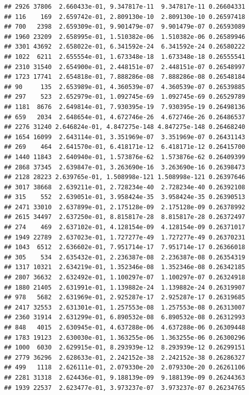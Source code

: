 \documentclass[
]{article}
\begin{document}
\begin{verbatim}
## 2926 37806  2.660433e-01, 9.347817e-11  9.347817e-11 0.26604331
## 116    169  2.659742e-01, 2.809130e-10  2.809130e-10 0.26597418
## 700   2398  2.659309e-01, 9.901479e-07  9.901479e-07 0.26593089
## 1960 23209  2.658995e-01, 1.510382e-06  1.510382e-06 0.26589946
## 3301 43692  2.658022e-01, 6.341592e-24  6.341592e-24 0.26580222
## 1022  6211  2.655554e-01, 1.673348e-18  1.673348e-18 0.26555541
## 2310 31540  2.654900e-01, 2.448151e-07  2.448151e-07 0.26548997
## 1723 17741  2.654818e-01, 7.888286e-08  7.888286e-08 0.26548184
## 90     135  2.653989e-01, 4.360539e-07  4.360539e-07 0.26539885
## 297    523  2.652979e-01, 1.092745e-69  1.092745e-69 0.26529789
## 1181  8676  2.649814e-01, 7.930395e-19  7.930395e-19 0.26498136
## 659   2034  2.648654e-01, 4.672746e-26  4.672746e-26 0.26486537
## 2276 31240 2.646824e-01, 4.847275e-148 4.847275e-148 0.26468240
## 1654 16099  2.643114e-01, 3.351969e-07  3.351969e-07 0.26431143
## 269    464  2.641570e-01, 6.418171e-12  6.418171e-12 0.26415700
## 1440 11843  2.640940e-01, 1.573876e-62  1.573876e-62 0.26409399
## 2868 37345  2.639847e-01, 3.263690e-16  3.263690e-16 0.26398473
## 2128 28223 2.639765e-01, 1.508998e-121 1.508998e-121 0.26397646
## 3017 38668  2.639211e-01, 2.728234e-40  2.728234e-40 0.26392108
## 315    552  2.639051e-01, 3.958424e-35  3.958424e-35 0.26390513
## 2471 33010  2.637899e-01, 2.175128e-09  2.175128e-09 0.26378992
## 2615 34497  2.637250e-01, 8.815817e-28  8.815817e-28 0.26372497
## 274    469  2.637102e-01, 4.128154e-09  4.128154e-09 0.26371017
## 1949 22789  2.637023e-01, 1.727277e-49  1.727277e-49 0.26370231
## 1043  6512  2.636602e-01, 7.951714e-17  7.951714e-17 0.26366018
## 305    534  2.635432e-01, 2.236387e-08  2.236387e-08 0.26354319
## 1317 10321  2.634219e-01, 1.352346e-08  1.352346e-08 0.26342185
## 2807 36632  2.632492e-01, 1.100297e-07  1.100297e-07 0.26324918
## 1880 21405  2.631991e-01, 1.139882e-24  1.139882e-24 0.26319907
## 978   5682  2.631969e-01, 2.925287e-17  2.925287e-17 0.26319685
## 2417 32553  2.631301e-01, 1.257553e-08  1.257553e-08 0.26313007
## 2360 31914  2.631299e-01, 6.890532e-08  6.890532e-08 0.26312993
## 848   4015  2.630945e-01, 4.637288e-06  4.637288e-06 0.26309448
## 1783 19123  2.630030e-01, 1.363255e-06  1.363255e-06 0.26300296
## 1000  6030  2.629915e-01, 8.293939e-12  8.293939e-12 0.26299151
## 2779 36296  2.628633e-01, 2.242152e-38  2.242152e-38 0.26286327
## 499   1118  2.626111e-01, 2.079330e-20  2.079330e-20 0.26261106
## 2281 31318  2.624436e-01, 9.188139e-09  9.188139e-09 0.26244363
## 1939 22537  2.623477e-01, 3.973237e-07  3.973237e-07 0.26234765

\end{verbatim}
\end{document}
